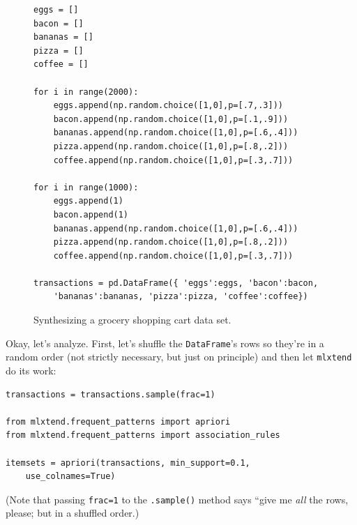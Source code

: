 \begin{figure}[ht]
\centering
{}
\begin{Verbatim}[fontsize=\footnotesize,frame=single,framesep=3mm]
eggs = []
bacon = []
bananas = []
pizza = []
coffee = []

for i in range(2000):
    eggs.append(np.random.choice([1,0],p=[.7,.3]))
    bacon.append(np.random.choice([1,0],p=[.1,.9]))
    bananas.append(np.random.choice([1,0],p=[.6,.4]))
    pizza.append(np.random.choice([1,0],p=[.8,.2]))
    coffee.append(np.random.choice([1,0],p=[.3,.7]))

for i in range(1000):
    eggs.append(1)
    bacon.append(1)
    bananas.append(np.random.choice([1,0],p=[.6,.4]))
    pizza.append(np.random.choice([1,0],p=[.8,.2]))
    coffee.append(np.random.choice([1,0],p=[.3,.7]))

transactions = pd.DataFrame({ 'eggs':eggs, 'bacon':bacon,
    'bananas':bananas, 'pizza':pizza, 'coffee':coffee})
\end{Verbatim}
\caption{Synthesizing a grocery shopping cart data set.}
\label{fig:synthGroceries}
\end{figure}

\bigskip

Okay, let's analyze. First, let's shuffle the \texttt{DataFrame}'s rows so
they're in a random order (not strictly necessary, but just on principle) and
then let \texttt{mlxtend} do its work:


\begin{Verbatim}[fontsize=\small,samepage=true,frame=single,framesep=3mm]
transactions = transactions.sample(frac=1)

from mlxtend.frequent_patterns import apriori
from mlxtend.frequent_patterns import association_rules

itemsets = apriori(transactions, min_support=0.1,
    use_colnames=True)
\end{Verbatim}

(Note that passing \texttt{frac=1} to the \texttt{.sample()} method says ``give
me \textit{all} the rows, please; but in a shuffled order.)


